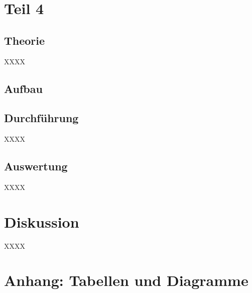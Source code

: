 \documentclass[11pt,a4paper]{article}
\newcommand{\halftime}[4]{\begin{figure}[h]
\begin{minipage}{.#1\textwidth}#3\end{minipage}\begin{minipage}{.#2\textwidth}
\centering
#4\end{minipage}
\end{figure}}
\begin{document}
\section{Teil 4}

\subsection{Theorie}

XXXX

\subsection{Aufbau}



\subsection{Durchführung}

XXXX

\subsection{Auswertung}

XXXX

\section{Diskussion}

XXXX

\pagebreak

\section{Anhang: Tabellen und Diagramme}
\end{document}
